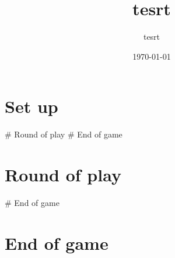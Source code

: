 \documentclass{article}%
\title{tesrt}%
\author{tesrt}%
\date{\today}%
\begin{document}
%
\pagestyle{empty}%
\normalsize%
\maketitle%
\section{ Set up 
}%
\label{sec:Setup}%
\# Round of play 
%
\# End of game

%
\section{ Round of play 
}%
\label{sec:Roundofplay}%
\# End of game

%
\section{ End of game}%
\label{sec:Endofgame}%

%
\end{document}
